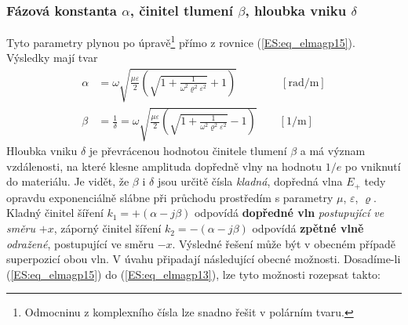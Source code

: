       \subsubsection{Fázová konstanta \(\alpha\), činitel tlumení \(\beta\), hloubka vniku 
                      \(\delta\)}
        Tyto parametry plynou po úpravě\footnote{Odmocninu z komplexního čísla lze snadno řešit v 
        polárním tvaru.} přímo z rovnice (\ref{ES:eq_elmagp15}). Výsledky mají tvar
        \begin{subequations}
          \begin{align}
            \alpha &= \omega\sqrt{
                              \frac{\mu\varepsilon}{2}
                                \left(
                                  \sqrt{1+\frac{1}{\omega^2\varrho^2\varepsilon^2}} +1 
                                \right)}                
                      \qquad\qquad [\unit{\radian/\meter}]  \label{ES:eq_elmagp16a}  \\
            \beta  &= \frac{1}{\delta} 
                    = \omega\sqrt{
                              \frac{\mu\varepsilon}{2}
                                \left(
                                  \sqrt{1+\frac{1}{\omega^2\varrho^2\varepsilon^2}} -1
                                \right)}               
                      \qquad [\unit{1/\meter}]               \label{ES:eq_elmagp16b}
          \end{align}
        \end{subequations}
        Hloubka vniku \(\delta\) je převrácenou hodnotou činitele tlumení \(\beta\) a má význam 
        vzdálenosti, na které klesne amplituda dopředně vlny na hodnotu \(1/e\) po vniknutí do 
        materiálu. Je vidět, že \(\beta\) i \(\delta\) jsou určitě čísla \emph{kladná}, dopředná 
        vlna \(E_+\) tedy opravdu exponenciálně slábne při průchodu prostředím s parametry \(\mu\), 
        \(\varepsilon\), \(\varrho\). Kladný činitel šíření \(k_1=+(\alpha-j\beta)\) odpovídá 
        \textbf{dopředné vln} \emph{postupující ve směru} \(+x\), záporný činitel šíření 
        \(k_2=-(\alpha-j\beta)\) odpovídá \textbf{zpětné vlně} \emph{odražené}, postupující ve 
        směru \(-x\). Výsledné řešení může být v obecném případě superpozicí obou vln. V úvahu 
        připadají následující obecné možnosti. Dosadíme-li (\ref{ES:eq_elmagp15}) do 
        (\ref{ES:eq_elmagp13}), lze tyto možnosti rozepsat takto:

